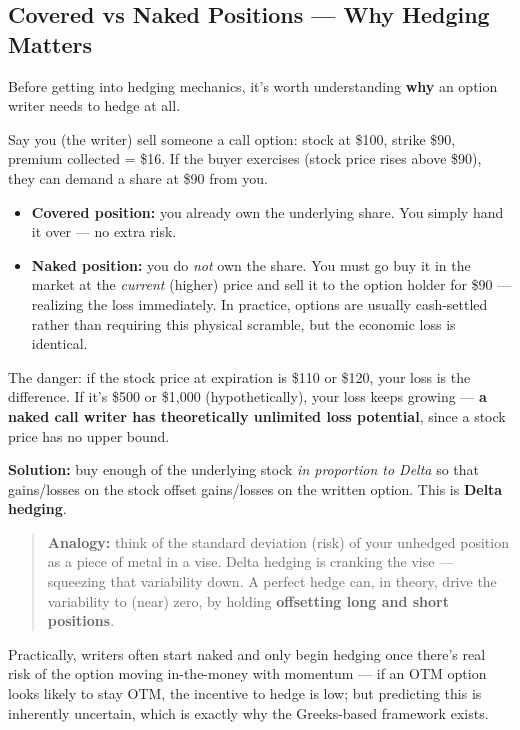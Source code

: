 \documentclass[12pt,openany]{book}
\theoremstyle{definition}
\theoremstyle{remark}
\begin{document}
\subsection{Covered vs Naked Positions — Why Hedging Matters}

Before getting into hedging mechanics, it's worth understanding \textbf{why} an option writer needs to hedge at all.

Say you (the writer) sell someone a call option: stock at \$100, strike \$90, premium collected = \$16. If the buyer exercises (stock price rises above \$90), they can demand a share at \$90 from you.

\begin{itemize}
\item \textbf{Covered position:} you already own the underlying share. You simply hand it over — no extra risk.
\item \textbf{Naked position:} you do \emph{not} own the share. You must go buy it in the market at the \emph{current} (higher) price and sell it to the option holder for \$90 — realizing the loss immediately. In practice, options are usually cash-settled rather than requiring this physical scramble, but the economic loss is identical.
\end{itemize}

The danger: if the stock price at expiration is \$110 or \$120, your loss is the difference. If it's \$500 or \$1,000 (hypothetically), your loss keeps growing — \textbf{a naked call writer has theoretically unlimited loss potential}, since a stock price has no upper bound.

\textbf{Solution:} buy enough of the underlying stock \emph{in proportion to Delta} so that gains/losses on the stock offset gains/losses on the written option. This is \textbf{Delta hedging}.

\begin{quote}
\textbf{Analogy:} think of the standard deviation (risk) of your unhedged position as a piece of metal in a vise. Delta hedging is cranking the vise — squeezing that variability down. A perfect hedge can, in theory, drive the variability to (near) zero, by holding \textbf{offsetting long and short positions}.
\end{quote}

Practically, writers often start naked and only begin hedging once there's real risk of the option moving in-the-money with momentum — if an OTM option looks likely to stay OTM, the incentive to hedge is low; but predicting this is inherently uncertain, which is exactly why the Greeks-based framework exists.
\end{document}
